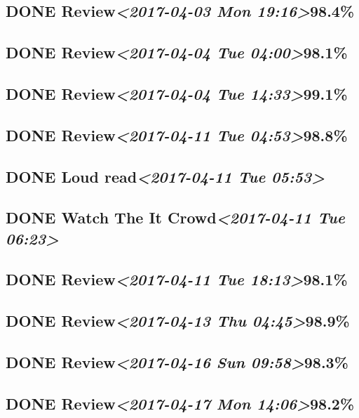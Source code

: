 \documentclass[11pt]{ctexart}
\begin{document}
\subsection{{\bfseries\sffamily DONE} Review\textit{<2017-04-03 Mon 19:16>}98.4\%}
\label{sec:orge12ec0b}
\subsection{{\bfseries\sffamily DONE} Review\textit{<2017-04-04 Tue 04:00>}98.1\%}
\label{sec:org60ac2ac}
\subsection{{\bfseries\sffamily DONE} Review\textit{<2017-04-04 Tue 14:33>}99.1\%}
\label{sec:orgf404cfd}
\subsection{{\bfseries\sffamily DONE} Review\textit{<2017-04-11 Tue 04:53>}98.8\%}
\label{sec:orga390fab}
\subsection{{\bfseries\sffamily DONE} Loud read\textit{<2017-04-11 Tue 05:53>}}
\label{sec:orgf339ab2}
\subsection{{\bfseries\sffamily DONE} Watch The It Crowd\textit{<2017-04-11 Tue 06:23>}}
\label{sec:orgb117440}
\subsection{{\bfseries\sffamily DONE} Review\textit{<2017-04-11 Tue 18:13>}98.1\%}
\label{sec:org1f53c6c}
\subsection{{\bfseries\sffamily DONE} Review\textit{<2017-04-13 Thu 04:45>}98.9\%}
\label{sec:org13fef43}
\subsection{{\bfseries\sffamily DONE} Review\textit{<2017-04-16 Sun 09:58>}98.3\%}
\label{sec:org616a1e6}
\subsection{{\bfseries\sffamily DONE} Review\textit{<2017-04-17 Mon 14:06>}98.2\%}
\label{sec:org8a53e67}
\end{document}
